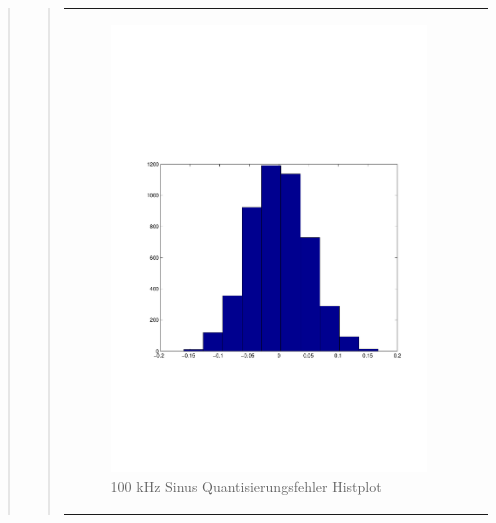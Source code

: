 \begin{quote}
\begin{quote}
\begin{center}
\begin{tabular}{ll}
                \begin{minipage}{0.6\textwidth}
                    \begin{figure}[H]
                        \includegraphics[scale=0.5, trim = 16mm 70mm 16mm 85mm, clip]
                                        {Bilder/100kHz_sin_Quant_Hist}
                        \caption{100 kHz Sinus Quantisierungsfehler Histplot}
                        \label{fig:100kHz_sin_Hist}
                    \end{figure}
                \end{minipage}
            
            \end{tabular}
        \end{center}
            
        \vspace{2em}
	   	

\end{quote}
\end{quote}

